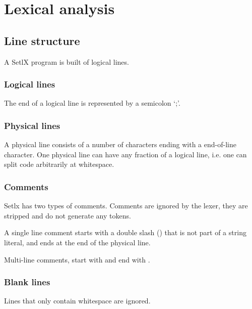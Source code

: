 \section{Lexical analysis}

%
%
\subsection{Line structure}

A SetlX program is built of logical lines.

%
\subsubsection{Logical lines}

The end of a logical line is represented by a semicolon `;'.

%
\subsubsection{Physical lines}

A physical line consists of a number of characters ending with a end-of-line character. One physical line can have any fraction of a logical line, i.e. one can split code arbitrarily at whitespace.

%
\subsubsection{Comments}

Setlx has two types of comments. Comments are ignored by the lexer, they are stripped and do not generate any tokens.


A single line comment starts with a double slash (\token{//}) that is not part of a string literal, and ends at the end of the physical line. 


Multi-line comments, start with \token{/*} and end with \token{*/}.

%
\subsubsection{Blank lines}

Lines that only contain whitespace are ignored.


